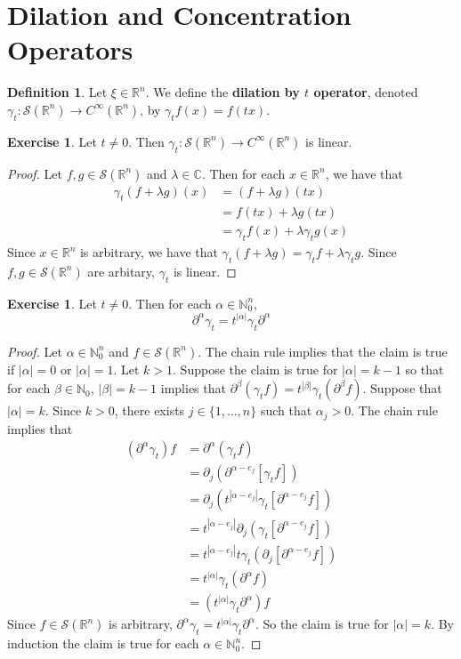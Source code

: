 \documentclass{book}
\theoremstyle{definition}
\newtheorem{defn}[definition]{Definition}
\newtheorem{ex}[definition]{Exercise}
\newcommand{\al}{\alpha}
\newcommand{\be}{\beta}
\newcommand{\gam}{\gamma}
\newcommand{\lam}{\lambda}
\newcommand{\C}{\mathbb{C}}
\newcommand{\N}{\mathbb{N}}
\newcommand{\R}{\mathbb{R}}
\newcommand{\MS}{\mathcal{S}}
\DeclareMathOperator*{\0}{\mbf{0}}
\DeclareMathOperator*{\1}{\mbf{1}}
\newcommand{\p}{\partial}
\begin{document}
	
	
	
	
	
	
	
	\newpage
	\section{Dilation and Concentration Operators}

	\begin{defn}
		Let $\xi \in \R^n$. We define the \textbf{dilation by $t$ operator}, denoted $\gam_t: \MS(\R^n) \rightarrow C^{\infty}(\R^n)$, by $\gam_t f(x) = f(tx)$.
	\end{defn}
	
	\begin{ex}
		Let $t \neq 0$. Then $\gam_t: \MS(\R^n) \rightarrow C^{\infty}(\R^n)$ is linear.
	\end{ex}
	
	\begin{proof}
		Let $f, g \in \MS(\R^n)$ and $\lam \in \C$. Then for each $x \in \R^n$, we have that
		\begin{align*}
			\gam_t(f + \lam g)(x) 
			& =(f+ \lam g)(tx) \\
			& = f(tx) + \lam g(tx) \\
			& = \gam_tf (x) + \lam \gam_t g(x)
		\end{align*}
		Since $x \in \R^n$ is arbitrary, we have that $\gam_t (f + \lam g) = \gam_t f + \lam \gam_t g$. Since $f, g \in \MS(\R^n)$ are arbitary, $\gam_t$ is linear. 
	\end{proof}
	
	\begin{ex}
		Let $t \neq 0$. Then for each $\al \in \N_0^n$,  
		$$\p^{\al} \gam_t = t^{|\al|} \gam_t \p^{\al} $$
	\end{ex}
	
	\begin{proof}
		Let $\al \in \N_0^n$ and $f \in \MS(\R^n)$. The chain rule implies that the claim is true if $|\al| = 0$ or $|\al| = 1$. Let $k > 1$. Suppose the claim is true for $|\al| = k-1$ so that for each $\be \in \N_0$, $|\be| = k-1$ implies that $\p^{\be} (\gam_t f) = t^{|\be|} \gam_t( \p^{\be} f)$. Suppose that $|\al| = k$. Since $k > 0$, there exists $j \in \{1, \ldots, n\}$ such that $\al_j > 0$. The chain rule implies that
		\begin{align*}
			(\p^{\al} \gam_t) f
			& = \p^{\al} (\gam_t f) \\
			& = \p_j (\p^{\al - e_j} [\gam_t f]) \\
			& = \p_j (t^{|\al - e_j|} \gam_t [\p^{\al - e_j} f]) \\
			& = t^{|\al - e_j|} \p_j (\gam_t [\p^{\al - e_j} f]) \\
			& = t^{|\al - e_j|} t \gam_t (\p_j [\p^{\al - e_j} f]) \\
			& = t^{|\al|} \gam_t (\p^{\al} f) \\
			& = (t^{|\al|} \gam_t \p^{\al}) f
		\end{align*} 
		Since $f \in \MS(\R^n)$ is arbitrary, $\p^{\al} \gam_t = t^{|\al|} \gam_t \p^{\al}$. So the claim is true for $|\al| = k$. By induction the claim is true for each $\al \in \N_0^n$. 
	\end{proof}
\end{document}
